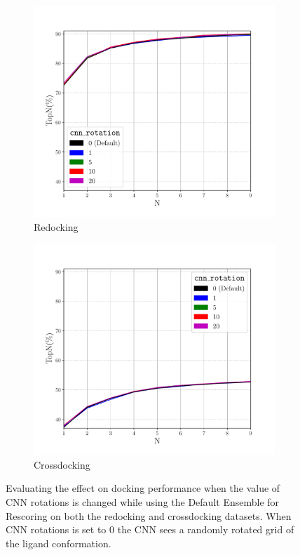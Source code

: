\documentclass[journal=jcisd8,manuscript=article]{achemso}
\begin{document}
\begin{figure}    
        \begin{subfigure}[b]{0.48\textwidth}    
		\centering
		\includegraphics[width=\textwidth]{figures/redocking/sweep_cnnrot_line.pdf}
		\caption{Redocking}
		\label{fig:CNNRotRedock}
        \end{subfigure}    
        \begin{subfigure}[b]{0.48\textwidth}    
		\centering
		\includegraphics[width=\textwidth]{figures/crossdocking/sweep_cnnrot_line.pdf}
		\caption{Crossdocking}
		\label{fig:CNNRotCrossdock}
        \end{subfigure}    
	\caption{Evaluating the effect on docking performance when the value of CNN rotations is changed while using the Default Ensemble for Rescoring on both the redocking and crossdocking datasets. When CNN rotations is set to 0 the CNN sees a randomly rotated grid of the ligand conformation.}
	\label{fig:CNNRot}
\end{figure}
\end{document}
